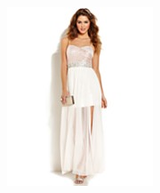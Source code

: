 \documentclass[11pt]{article}
\begin{document}
\begin{figure}
\begin{subfigure}{.18\textwidth}
\label{fig:sub2}
\end{subfigure}
\begin{subfigure}{.18\textwidth}
\centering
\includegraphics[width=\linewidth]{concepts/concept1_neg3.jpg}
\label{fig:sub2}
\end{subfigure}
\begin{subfigure}{.18\textwidth}
\centering

\end{subfigure}
\end{figure}
\end{document}

